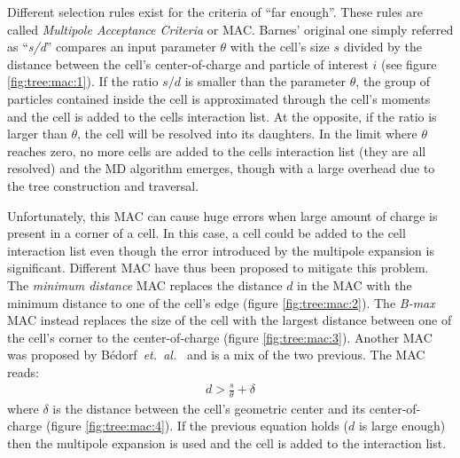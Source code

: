 Different selection rules exist for the criteria of ``far enough''. These
rules are called \textit{Multipole Acceptance Criteria} or
MAC\cite{Pfalzner1996}. Barnes' original one simply referred as
``\textit{s/d}'' compares an input parameter $\theta$ with the cell's size $s$
divided by the distance between the cell's center-of-charge and particle of
interest $i$ (see figure \ref{fig:tree:mac:1}).
If the ratio $s/d$ is smaller than the parameter $\theta$, the
group of particles contained inside the cell is approximated through the cell's
moments and the cell is added to the cells interaction list. At the opposite, if
the ratio is larger than $\theta$, the cell will be resolved into its daughters.
In the limit where $\theta$ reaches zero, no more cells are added to the
cells interaction list (they are all resolved) and the MD algorithm emerges, though
with a large overhead due to the tree construction and traversal.

Unfortunately, this MAC can cause huge errors when large amount of charge is
present in a corner of a cell\cite{Pfalzner1996}.
In this case, a cell could be added to the cell
interaction list even though the error introduced by the multipole expansion is
significant. Different MAC have thus been proposed to mitigate this problem.
The \textit{minimum distance} MAC replaces the distance $d$ in the MAC with the
minimum distance to one of the cell's edge (figure \ref{fig:tree:mac:2}).
The \textit{B-max} MAC instead
replaces the size of the cell with the largest distance between one of the
cell's corner to the center-of-charge (figure \ref{fig:tree:mac:3}).
Another MAC was proposed by
B\'edorf~\textit{et.~al.}~\cite{Bedorf2012} and is a mix of the two previous.
The MAC reads:
\begin{align}
d > \frac{s}{\theta} + \delta
\end{align}
where $\delta$ is the distance between the cell's geometric center and its
center-of-charge (figure \ref{fig:tree:mac:4}).
If the previous equation holds ($d$ is large enough) then the
multipole expansion is used and the cell is added to the interaction list.

